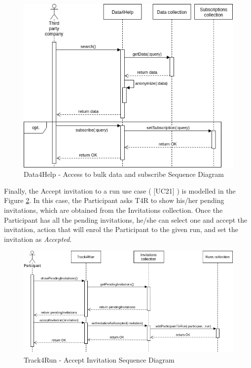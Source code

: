 \documentclass[a4paper, hidelinks, 12pt]{report}
\newcommand\usecase[1]{ [UC#1] }
\begin{document}
	\begin{figure}[H]
		\centering
		\includegraphics[scale=0.6]{Diagrams/d4h_seq_subscribe_to_bulk_query.png}
		\caption[Data4Help - Access to bulk data and subscribe Sequence Diagram]{Data4Help - Access to bulk data and subscribe Sequence Diagram}
		\label{fig:d4h_seq_bulk_data}
	\end{figure}
	
	Finally, the Accept invitation to a run use case (\usecase{21}) is modelled in the Figure \ref{fig:t4r_accept_invitation}. In this case, the Participant asks T4R to show his/her pending invitations, which are obtained from the Invitations collection. Once the Participant has all the pending invitations, he/she can select one and accept the invitation, action that will enrol the Participant to the given run, and set the invitation as \textit{Accepted}.
	
	\begin{figure}[H]
		\centering
		\includegraphics[scale=0.6]{Diagrams/t4r_seq_accept_invitation.png}
		\caption[Track4Run - Accept Invitation Sequence Diagram]{Track4Run - Accept Invitation Sequence Diagram}
		\label{fig:t4r_accept_invitation}
	\end{figure}
		
\end{document}
